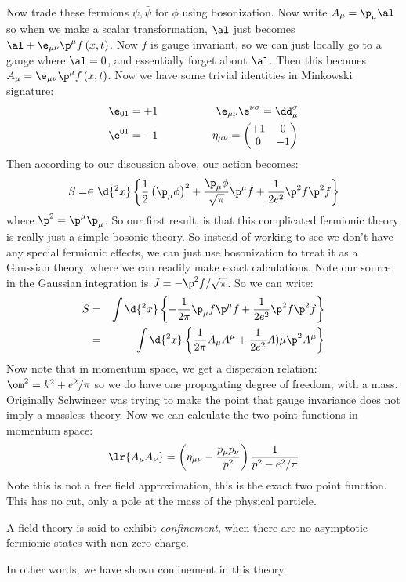 \documentclass{booc}
\begin{document}
Now trade these fermions $\psi , \bar \psi$ for $\phi$
using bosonization.
Now write $A_\mu= \p_\mu \al$
so when we make a scalar transformation, $\al$ just becomes 
$\al + \e_{\mu\nu} \p^\mu f\left( x , t \right)$.
Now $f$ is gauge invariant, so we can just locally go to a gauge where $\al = 0$, and essentially
forget about $\al$.
Then this becomes
$A_\mu = \e_{\mu\nu} \p^\mu f\left( x , t \right)$.
Now we have some trivial identities in Minkowski signature:
\begin{eqnarray}
\e_{01} = +1
&\qquad\qquad&
\e_{\mu\nu} \e^{\nu\sigma} = \dd_\mu^\sigma
\\
\e^{01} = -1 
&\qquad\qquad&
\eta_{\mu\nu} =
\begin{pmatrix}
+1 & 0 \\
0 & -1
\end{pmatrix}
\end{eqnarray}
Then according to our discussion above, our action becomes:
\begin{equation}
S = \in \d{^2 x}
\left\{ 
\frac{1}{2} \left( \p_\mu \phi \right)^2 + 
\frac{\p_\mu \phi}{\sqrt{\pi}}
\p^\mu f
+ \frac{1}{2e^2} \p^2 f \p^2 f
\right\}
\end{equation}
where $\p^2 = \p^\mu \p_\mu$. 
So our first result, is that this complicated fermionic theory is really just a simple bosonic
theory.
So instead of working to see we don't have any special fermionic effects, we can just
use bosonization to treat it as a Gaussian theory, where we can readily make exact calculations.
Note our source in the Gaussian integration is
$J = -\p^2 f / \sqrt{\pi}$.
So we can write:
\begin{eqnarray}
S &=&  
\int \d{^2 x} \left\{ 
-\frac{1}{2\pi} \p_\mu f \p^\mu f
+ \frac{1}{2e^2} \p^2 f \p^2 f
\right\}
\\ &=& 
\int \d{^2 x} \left\{ 
\frac{1}{2\pi} A_\mu A^\mu  +\frac{1}{2e^2} A)\mu \p^2 A^\mu
\right\}
\end{eqnarray}
Now note that in momentum space, we get a dispersion relation: 
$\om^2 = k^2 + e^2 / \pi$
so we do have one propagating degree of freedom, with a mass. 
Originally Schwinger was trying to make the point that gauge invariance does not imply
a massless theory.
Now we can calculate the two-point functions in momentum space:
\begin{eqnarray}
\lr{A_\mu A_\nu} = 
\left( 
\eta_{\mu\nu} - \frac{p_\mu p_\nu}{p^2}
\right)
\frac{1}{p^2 - e^2 / \pi}
\end{eqnarray}
Note this is not a free field approximation,
this is the exact two point function.
This has no cut, only a pole at the mass of the physical particle.
\begin{defn}
A field theory is said to exhibit \emph{confinement},
when there are no asymptotic fermionic states with non-zero charge.
\end{defn}
In other words, we have shown confinement in this theory. 
\end{document}
